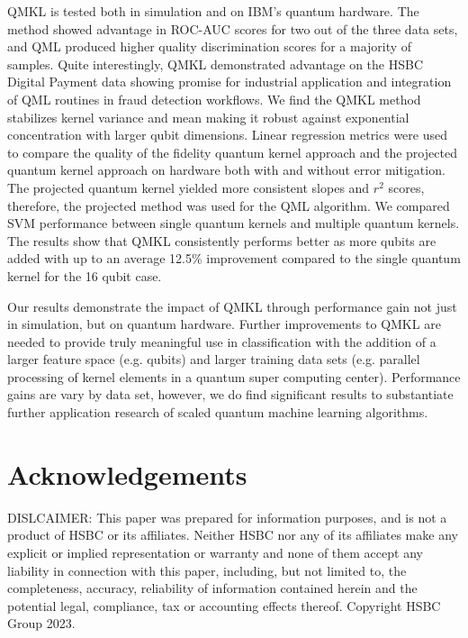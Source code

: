\documentclass[reprint,amsfonts, amssymb, amsmath,  showkeys, nofootinbib,pra, superscriptaddress, twocolumn,longbibliography]{revtex4-2}
\begin{document}
QMKL is tested both in simulation and on IBM's quantum hardware. The method showed advantage in ROC-AUC scores for two out of the three data sets, and QML produced higher quality discrimination scores for a majority of samples. Quite interestingly, QMKL demonstrated advantage on the HSBC Digital Payment data showing promise for industrial application and integration of QML routines in fraud detection workflows. We find the QMKL method stabilizes kernel variance and mean making it robust against exponential concentration with larger qubit dimensions. Linear regression metrics were used to compare the quality of the fidelity quantum kernel approach and the projected quantum kernel approach on hardware both with and without error mitigation. The projected quantum kernel yielded more consistent slopes and $r^2$ scores, therefore, the projected method was used for the QML algorithm. We compared SVM performance between single quantum kernels and multiple quantum kernels. The results show that QMKL consistently performs better as more qubits are added with up to an average 12.5\% improvement compared to the single quantum kernel for the 16 qubit case.

Our results demonstrate the impact of QMKL through performance gain not just in simulation, but on quantum hardware. Further improvements to QMKL are needed to provide truly meaningful use in classification with the addition of a larger feature space (e.g. qubits) and larger training data sets (e.g. parallel processing of kernel elements in a quantum super computing center). Performance gains are vary by data set, however, we do find significant results to substantiate further application research of scaled quantum machine learning algorithms.
 
\section*{Acknowledgements}
DISLCAIMER: This paper was prepared for information purposes, and is not a product of HSBC or its affiliates. Neither HSBC nor any of its affiliates make any explicit or implied representation or warranty and none of them accept any liability in connection with this paper, including, but not limited to, the completeness, accuracy, reliability of information contained herein and the potential legal, compliance, tax or accounting effects thereof. Copyright HSBC Group 2023.



\end{document}
